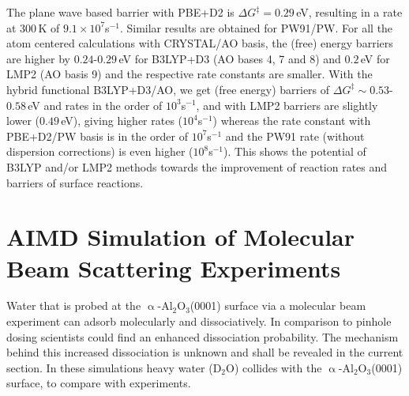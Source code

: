 \documentclass[11pt,DIV=13,BCOR=5mm,a4paper,headinclude]{scrbook}
\begin{document}

The plane wave based barrier with PBE+D2 is $\Delta G^\ddagger=0.29\,$eV, resulting in a rate at $300\,$K of $9.1\times 10^7$s$^{-1}$.
Similar results are obtained for PW91/PW.
For all the atom centered calculations with CRYSTAL/AO basis, the (free) energy barriers are higher by $0.24$-$0.29\,$eV for B3LYP+D3 (AO bases 4, 7 and 8) and $0.2\,$eV for LMP2 (AO basis 9) and the respective rate constants are smaller.
With the hybrid functional B3LYP+D3/AO, we get (free energy) barriers of $\Delta G^\ddagger\sim0.53$-$0.58\,$eV and rates in the order of $10^3$s$^{-1}$, and with LMP2 barriers are slightly lower ($0.49\,$eV), giving higher rates ($10^4$s$^{-1}$) whereas the rate constant with PBE+D2/PW basis is in the order of $10^7$s$^{-1}$ and the PW91 rate (without dispersion corrections) is even higher ($10^8$s$^{-1}$). 
This shows the potential of B3LYP and/or LMP2 methods towards the improvement of reaction rates and barriers of surface reactions.

  
\section[AIMD Simulation of Molecular Beam Scattering Experiments]{AIMD Simulation of Molecular Beam Scattering Experiments\cite{Heiden0001_2018}}\label{sec_0001AIMD}
Water that is probed at the $\upalpha$-Al$_2$O$_3$(0001) surface via a molecular beam experiment can adsorb molecularly and dissociatively.
In comparison to pinhole dosing scientists could find an enhanced dissociation probability\cite{Heiden0001_2018}.
The mechanism behind this increased dissociation is unknown and shall be revealed in the current section.
In these simulations heavy water (D$_2$O) collides with the $\upalpha$-Al$_{\text{2}}$O$_{\text{3}}$(0001) surface, to compare with experiments.
\end{document}
